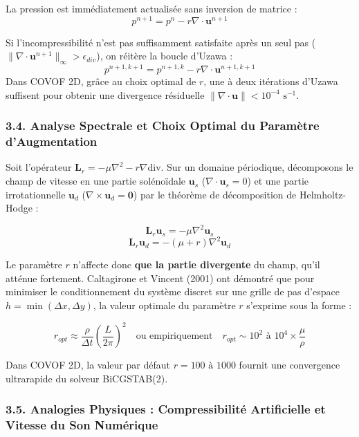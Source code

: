 \documentclass[
  french,
]{article}
\begin{document}
La pression est immédiatement actualisée sans inversion de matrice :
\[p^{n+1} = p^n - r \nabla \cdot \mathbf{u}^{n+1}\]

Si l'incompressibilité n'est pas suffisamment satisfaite après un seul
pas (\(\|\nabla \cdot \mathbf{u}^{n+1}\|_\infty > \epsilon_{div}\)), on
réitère la boucle d'Uzawa :
\[p^{n+1, k+1} = p^{n+1, k} - r \nabla \cdot \mathbf{u}^{n+1, k+1}\]
Dans COVOF 2D, grâce au choix optimal de \(r\), une à deux itérations
d'Uzawa suffisent pour obtenir une divergence résiduelle
\(\|\nabla \cdot \mathbf{u}\| < 10^{-4}\text{ s}^{-1}\).

\subsubsection{3.4. Analyse Spectrale et Choix Optimal du Paramètre
d'Augmentation}\label{analyse-spectrale-et-choix-optimal-du-paramuxe8tre-daugmentation}

Soit l'opérateur \(\mathbf{L}_r = -\mu \nabla^2 - r \nabla \text{div}\).
Sur un domaine périodique, décomposons le champ de vitesse en une partie
solénoïdale \(\mathbf{u}_s\) (\(\nabla \cdot \mathbf{u}_s = 0\)) et une
partie irrotationnelle \(\mathbf{u}_d\)
(\(\nabla \times \mathbf{u}_d = \mathbf{0}\)) par le théorème de
décomposition de Helmholtz-Hodge :

\[\mathbf{L}_r \mathbf{u}_s = -\mu \nabla^2 \mathbf{u}_s\]
\[\mathbf{L}_r \mathbf{u}_d = -(\mu + r) \nabla^2 \mathbf{u}_d\]

Le paramètre \(r\) n'affecte donc \textbf{que la partie divergente} du
champ, qu'il atténue fortement. Caltagirone et Vincent (2001) ont
démontré que pour minimiser le conditionnement du système discret sur
une grille de pas d'espace \(h = \min(\Delta x, \Delta y)\), la valeur
optimale du paramètre \(r\) s'exprime sous la forme :

\[r_{opt} \approx \frac{\rho}{\Delta t} \left( \frac{L}{2\pi} \right)^2 \quad \text{ou empiriquement} \quad r_{opt} \sim 10^2 \text{ à } 10^4 \times \frac{\mu}{\rho}\]

Dans COVOF 2D, la valeur par défaut \(r = 100\text{ à }1000\) fournit
une convergence ultrarapide du solveur BiCGSTAB(2).

\subsubsection{3.5. Analogies Physiques : Compressibilité Artificielle
et Vitesse du Son
Numérique}\label{analogies-physiques-compressibilituxe9-artificielle-et-vitesse-du-son-numuxe9rique}
\end{document}
